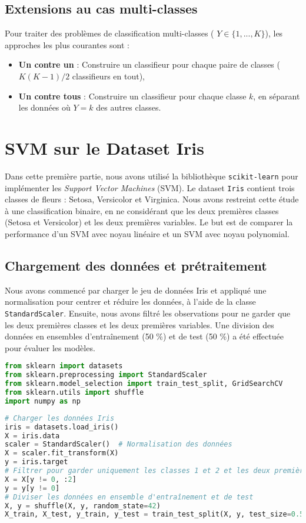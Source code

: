 \documentclass[12pt,a4paper]{report}
\begin{document}
\subsection{Extensions au cas multi-classes}

Pour traiter des problèmes de classification multi-classes ( \( Y \in \{1, ..., K\} \)), les approches les plus courantes sont :
\begin{itemize}
    \item \textbf{Un contre un} : Construire un classifieur pour chaque paire de classes ( \( K(K-1)/2 \) classifieurs en tout),
    \item \textbf{Un contre tous} : Construire un classifieur pour chaque classe \( k \), en séparant les données où \( Y = k \) des autres classes.
\end{itemize}


\section{SVM sur le Dataset Iris}

Dans cette première partie, nous avons utilisé la bibliothèque \texttt{scikit-learn} pour implémenter les \textit{Support Vector Machines} (SVM). Le dataset \texttt{Iris} contient trois classes de fleurs : Setosa, Versicolor et Virginica. Nous avons restreint cette étude à une classification binaire, en ne considérant que les deux premières classes (Setosa et Versicolor) et les deux premières variables. Le but est de comparer la performance d’un SVM avec noyau linéaire et un SVM avec noyau polynomial.

\subsection{Chargement des données et prétraitement}

Nous avons commencé par charger le jeu de données Iris et appliqué une normalisation pour centrer et réduire les données, à l'aide de la classe \texttt{StandardScaler}. Ensuite, nous avons filtré les observations pour ne garder que les deux premières classes et les deux premières variables. Une division des données en ensembles d'entraînement (50 \%) et de test (50 \%) a été effectuée pour évaluer les modèles.

\begin{lstlisting}[language=Python, caption=importation des packages]
from sklearn import datasets
from sklearn.preprocessing import StandardScaler
from sklearn.model_selection import train_test_split, GridSearchCV
from sklearn.utils import shuffle
import numpy as np
\end{lstlisting}
\begin{lstlisting}[language=Python, caption=Chargement des données et prétraitement]
# Charger les données Iris
iris = datasets.load_iris()
X = iris.data
scaler = StandardScaler()  # Normalisation des données
X = scaler.fit_transform(X)
y = iris.target
# Filtrer pour garder uniquement les classes 1 et 2 et les deux premières variables
X = X[y != 0, :2]
y = y[y != 0]
# Diviser les données en ensemble d'entraînement et de test
X, y = shuffle(X, y, random_state=42)
X_train, X_test, y_train, y_test = train_test_split(X, y, test_size=0.5, random_state=42)
\end{lstlisting}
\end{document}
